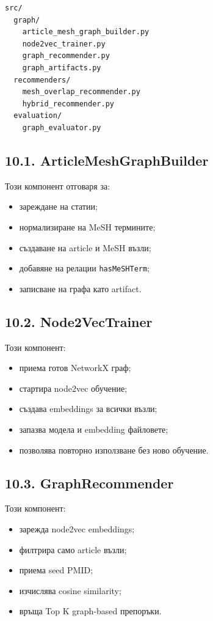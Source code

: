 \documentclass[12pt,a4paper]{article}
\providecommand{\tightlist}{\setlength{\itemsep}{0pt}\setlength{\parskip}{0pt}}
\begin{document}
\begin{verbatim}
src/
  graph/
    article_mesh_graph_builder.py
    node2vec_trainer.py
    graph_recommender.py
    graph_artifacts.py
  recommenders/
    mesh_overlap_recommender.py
    hybrid_recommender.py
  evaluation/
    graph_evaluator.py
\end{verbatim}

\subsection{10.1. ArticleMeshGraphBuilder}

Този компонент отговаря за:

\begin{itemize}
\tightlist
\item
  зареждане на статии;
\item
  нормализиране на MeSH термините;
\item
  създаване на article и MeSH възли;
\item
  добавяне на релации \texttt{hasMeSHTerm};
\item
  записване на графа като artifact.
\end{itemize}

\subsection{10.2. Node2VecTrainer}

Този компонент:

\begin{itemize}
\tightlist
\item
  приема готов NetworkX граф;
\item
  стартира node2vec обучение;
\item
  създава embeddings за всички възли;
\item
  запазва модела и embedding файловете;
\item
  позволява повторно използване без ново обучение.
\end{itemize}

\subsection{10.3. GraphRecommender}

Този компонент:

\begin{itemize}
\tightlist
\item
  зарежда node2vec embeddings;
\item
  филтрира само article възли;
\item
  приема seed PMID;
\item
  изчислява cosine similarity;
\item
  връща Top K graph-based препоръки.
\end{itemize}
\end{document}

